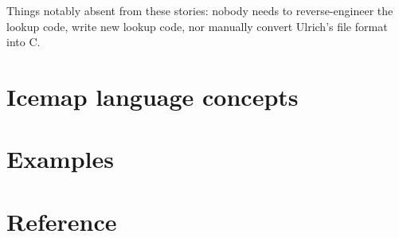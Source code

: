 \documentclass{mitsuba}
\begin{document}
Things notably absent from these stories:  nobody needs to reverse-engineer
the lookup code, write new lookup code, nor manually convert Ulrich's file
format into C.


\chapter{Icemap language concepts}


\chapter{Examples}


\chapter{Reference}

\end{document}
